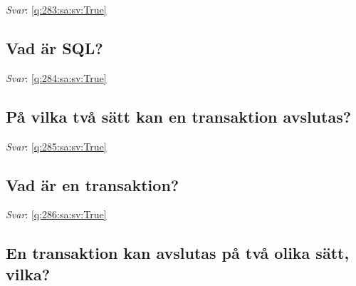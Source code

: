 \documentclass[a4paper,11pt,oneside]{article}
\begin{document}
\begin{sloppypar}
\label{q:283:sa:sv:False}

\vspace{2cm}

\noindent\makebox[\textwidth]{\hrulefill}

\vspace{1cm}

\textit{Svar}: \autoref{q:283:sa:sv:True}



\subsection{Vad \"ar SQL?}

\label{q:284:sa:sv:False}

\vspace{2cm}

\noindent\makebox[\textwidth]{\hrulefill}

\vspace{1cm}

\textit{Svar}: \autoref{q:284:sa:sv:True}



\subsection{P\r{a} vilka tv\r{a} s\"att kan en transaktion avslutas?}

\label{q:285:sa:sv:False}

\vspace{2cm}

\noindent\makebox[\textwidth]{\hrulefill}

\vspace{1cm}

\textit{Svar}: \autoref{q:285:sa:sv:True}



\subsection{Vad \"ar en transaktion?}

\label{q:286:sa:sv:False}

\vspace{2cm}

\noindent\makebox[\textwidth]{\hrulefill}

\vspace{1cm}

\textit{Svar}: \autoref{q:286:sa:sv:True}



\subsection{En transaktion kan avslutas p\r{a} tv\r{a} olika s\"att, vilka?}


\end{sloppypar}
\end{document}

